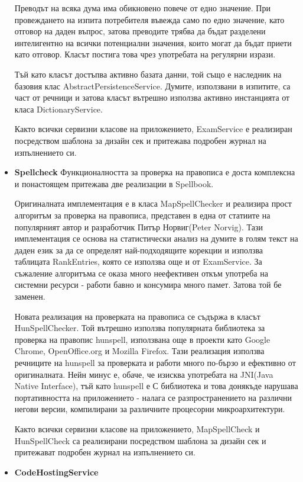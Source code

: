 \begin{itemize}
    Преводът на всяка дума има обикновено повече от едно значение. При
    провеждането на изпита потребителя въвежда само по едно значение,
    като отговор на даден въпрос, затова преводите трябва да бъдат
    разделени интелигентно на всички потенциални значения, които могат
    да бъдат приети като отговор. Класът постига това чрез употребата
    на регулярни изрази.

    Тъй като класът достъпва активно базата данни, той също е
    наследник на базовия клас AbstractPersistenceService. Думите,
    използвани в изпитите, са част от речници и затова класът вътрешно
    използва активно инстанцията от класа DictionaryService.

    Както всички сервизни класове на приложението, ExamService е
    реализиран посредством шаблона за дизайн сек и притежава подробен
    журнал на изпълнението си.
  \item \textbf{Spellcheck}
    Функционалността за проверка на правописа е доста комплексна и
    понастоящем притежава две реализации в Spellbook. 

    Оригиналната имплементация е в класа MapSpellChecker и реализира
    прост алгоритъм за проверка на правописа, представен в една от
    статиите на популярният автор и разработчик Питър Норвиг(Peter
    Norvig). Тази имплементация се основа на статистически анализ на
    думите в голям текст на даден език за да се определят
    най-подходящите корекции и използва таблицата RankEntries, която
    се използва още и от ExamService. За съжаление алгоритъма се оказа
    много неефективен откъм употреба на системни ресурси - работи
    бавно и консумира много памет. Затова той бе заменен.

    Новата реализация на проверката на правописа се съдържа в класът
    HunSpellChecker. Той вътрешно използва популярната библиотека за
    проверка на правопис hunspell, използвана още в проекти като
    Google Chrome, OpenOffice.org и Mozilla Firefox. Тази реализация
    използва речниците на hunspell за проверката и работи много
    по-бързо и ефективно от оригиналната. Нейн минус е, обаче, че
    изисква употребата на JNI(Java Native Interface), тъй като
    hunspell е С библиотека и това донякъде нарушава портативността на
    приложението - налага се разпространението на различни негови
    версии, компилирани за различните процесорни микроархитектури.
    
    Както всички сервизни класове на приложението, MapSpellCheck и HunSpellCheck са
    реализирани посредством шаблона за дизайн сек и притежават подробен
    журнал на изпълнението си.
  \item \textbf{CodeHostingService}


\end{itemize}
